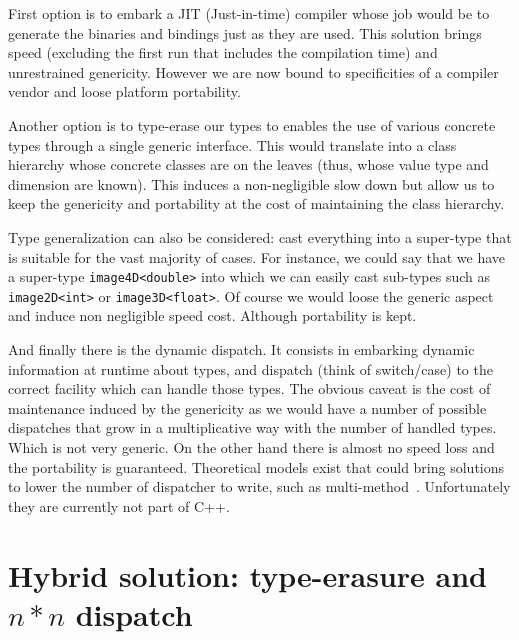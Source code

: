 First option is to embark a JIT (Just-in-time) compiler whose job would be to generate the binaries and bindings just as
they are used. This solution brings speed (excluding the first run that includes the compilation time) and unrestrained
genericity. However we are now bound to specificities of a compiler vendor and loose platform portability.

Another option is to type-erase our types to enables the use of various concrete types through a single generic
interface. This would translate into a class hierarchy whose concrete classes are on the leaves (thus, whose value type
and dimension are known). This induces a non-negligible slow down but allow us to keep the genericity and portability at
the cost of maintaining the class hierarchy.

Type generalization can also be considered: cast everything into a super-type that is suitable for the vast majority of
cases. For instance, we could say that we have a super-type \texttt{image4D<double>} into which we can easily cast
sub-types such as \texttt{image2D<int>} or \texttt{image3D<float>}. Of course we would loose the generic aspect and
induce non negligible speed cost. Although portability is kept.

And finally there is the dynamic dispatch. It consists in embarking dynamic information at runtime about types, and
dispatch (think of switch/case) to the correct facility which can handle those types. The obvious caveat is the cost of
maintenance induced by the genericity as we would have a number of possible dispatches that grow in a multiplicative way
with the number of handled types. Which is not very generic. On the other hand there is almost no speed loss and the
portability is guaranteed. Theoretical models exist that could bring solutions to lower the number of dispatcher to
write, such as multi-method~\cite{pirkelbauer.2010.multimethods}. Unfortunately they are currently not part of C++.



\section{Hybrid solution: type-erasure and $n*n$ dispatch}



